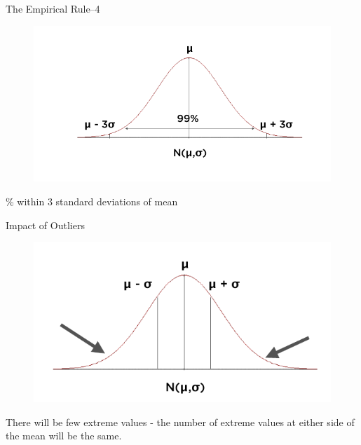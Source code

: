 \begin{frame}[t]{The Empirical Rule--4}
	
	\begin{figure} [ht]
		\centering
		\includegraphics[trim={0 1cm 0 0}, clip, scale=0.4]{eda/nd9.png}
	\end{figure}
	
	\% within 3 standard deviations of mean
	
\end{frame}

\begin{frame}[t]{Impact of Outliers}
	
	\begin{figure} [ht]
		\centering
		\includegraphics[trim={0 1cm 0 0}, clip, scale=0.4]{eda/nd6.png}
	\end{figure}
	
	\centering
	There will be few extreme values - the
	number of extreme values at either side of
	the mean will be the same.
\end{frame}

